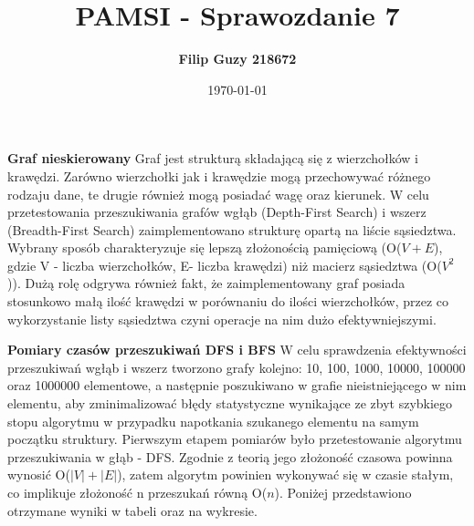 \documentclass[10pt, a4paper]{article}
\date{\today}
\title{\textbf{PAMSI - Sprawozdanie 7}}
\author{\textbf{Filip Guzy 218672}}
\begin{document}
\maketitle

\begin{flushleft}

\textbf{Graf nieskierowany} \newline \newline
Graf jest strukturą składającą się z wierzchołków i krawędzi. Zarówno wierzchołki jak i krawędzie mogą przechowywać różnego rodzaju dane, te drugie również mogą posiadać wagę oraz kierunek. W celu przetestowania przeszukiwania grafów wgłąb (Depth-First Search) i wszerz (Breadth-First Search) zaimplementowano strukturę opartą na liście sąsiedztwa. Wybrany sposób charakteryzuje się lepszą złożonością pamięciową (O($V+E$), gdzie V - liczba wierzchołków, E- liczba krawędzi) niż macierz sąsiedztwa (O($V^2$)). Dużą rolę odgrywa również fakt, że zaimplementowany graf posiada stosunkowo małą ilość krawędzi w porównaniu do ilości wierzchołków, przez co wykorzystanie listy sąsiedztwa czyni operacje na nim dużo efektywniejszymi. \newline

\textbf{Pomiary czasów przeszukiwań DFS i BFS} \newline \newline 
W celu sprawdzenia efektywności przeszukiwań wgłąb i wszerz tworzono grafy kolejno: 10, 100, 1000, 10000, 100000 oraz 1000000 elementowe, a następnie poszukiwano w grafie nieistniejącego w nim elementu, aby zminimalizować błędy statystyczne wynikające ze zbyt szybkiego stopu algorytmu w przypadku napotkania szukanego elementu na samym początku struktury. Pierwszym etapem pomiarów było przetestowanie algorytmu przeszukiwania w głąb - DFS. Zgodnie z teorią jego złożoność czasowa powinna wynosić O($|V|+|E|$), zatem algorytm powinien wykonywać się w czasie stałym, co implikuje złożoność n przeszukań równą O($n$). Poniżej przedstawiono otrzymane wyniki w tabeli oraz na wykresie. 


\end{flushleft}
\end{document}
